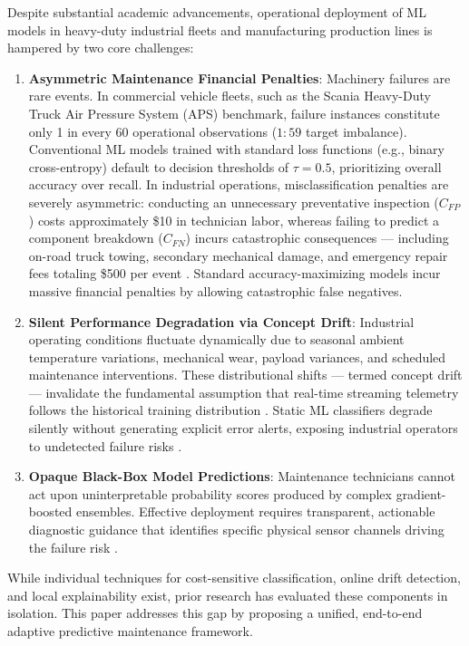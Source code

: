 \documentclass[journal]{IEEEtran}
\begin{document}
Despite substantial academic advancements, operational deployment of ML models in heavy-duty industrial fleets and manufacturing production lines is hampered by two core challenges:

\begin{enumerate}
    \item \textbf{Asymmetric Maintenance Financial Penalties}: Machinery failures are rare events. In commercial vehicle fleets, such as the Scania Heavy-Duty Truck Air Pressure System (APS) benchmark, failure instances constitute only 1 in every 60 operational observations ($1:59$ target imbalance). Conventional ML models trained with standard loss functions (e.g., binary cross-entropy) default to decision thresholds of $\tau = 0.5$, prioritizing overall accuracy over recall. In industrial operations, misclassification penalties are severely asymmetric: conducting an unnecessary preventative inspection ($C_{FP}$) costs approximately \$10 in technician labor, whereas failing to predict a component breakdown ($C_{FN}$) incurs catastrophic consequences --- including on-road truck towing, secondary mechanical damage, and emergency repair fees totaling \$500 per event \cite{akarte2018}. Standard accuracy-maximizing models incur massive financial penalties by allowing catastrophic false negatives.
    \item \textbf{Silent Performance Degradation via Concept Drift}: Industrial operating conditions fluctuate dynamically due to seasonal ambient temperature variations, mechanical wear, payload variances, and scheduled maintenance interventions. These distributional shifts --- termed concept drift --- invalidate the fundamental assumption that real-time streaming telemetry follows the historical training distribution \cite{lu2019}. Static ML classifiers degrade silently without generating explicit error alerts, exposing industrial operators to undetected failure risks \cite{tzelepis2025}.
    \item \textbf{Opaque Black-Box Model Predictions}: Maintenance technicians cannot act upon uninterpretable probability scores produced by complex gradient-boosted ensembles. Effective deployment requires transparent, actionable diagnostic guidance that identifies specific physical sensor channels driving the failure risk \cite{mothilal2020}.
\end{enumerate}

While individual techniques for cost-sensitive classification, online drift detection, and local explainability exist, prior research has evaluated these components in isolation. This paper addresses this gap by proposing a unified, end-to-end adaptive predictive maintenance framework.
\end{document}
